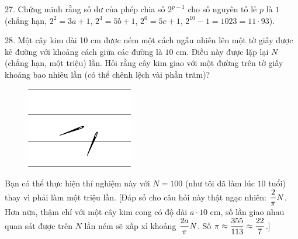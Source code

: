 \begin{problem}{27.}
	Chứng minh rằng số dư của phép chia số $2^{p-1}$ cho số nguyên tố lẻ $p$ là $1$ (chẳng hạn, $2^2=3a + 1$, $2^4=5b+1$, $2^6=5c+1$, $2^{10}-1=1023=11\cdot 93$).
\end{problem}

\begin{problem}{28.}
	Một cây kim dài 10 cm được ném một cách ngẫu nhiên lên một tờ giấy được kẻ đường với khoảng cách giữa các đường  là $10$ cm. Điều này được lặp lại $N$ (chẳng hạn, một  triệu) lần. Hỏi rằng cây kim giao với một đường trên tờ giấy khoảng bao nhiêu lần (có thể chênh lệch vài phần trăm)?
	\begin{figure}
		\includegraphics[scale=1]{taskbook-12}
	\end{figure}

	Bạn có thể thực hiện thí nghiệm này với $N=100$ (như tôi đã làm lúc $10$ tuổi) thay vì phải làm một triệu lần. [Đáp số cho câu hỏi này thật ngạc nhiên: $\dfrac{2}{\pi}N$. Hơn nữa, thậm chí với một cây kim cong có độ dài $a\cdot 10 $ cm, số lần giao nhau quan sát được trên $N$ lần ném sẽ xấp xỉ khoảng $\dfrac{2a}{\pi}N$. Số $\pi\approx \dfrac{355}{113}\approx \dfrac{22}{7}$.]
\end{problem}

